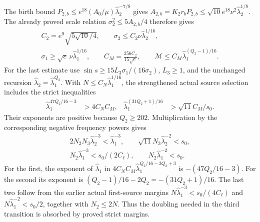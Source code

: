 The birth bound $P_{2,b}\leq e^{18}(A_0/\mu)
\widehat\lambda_2^{-7/8}$ gives
$A_{2,b}=K_2r_bP_{2,b}\leq\sqrt{10}e^{18}\nu^2
\widehat\lambda_2^{1/8}$. The already proved scale relation
$\sigma_2^2\leq5A_{2,b}/4$ therefore gives
\begin{equation}\label{tts:sourceconstants}
 \begin{gathered}
 C_2=e^9\sqrt{5\sqrt{10}/4},\qquad
 \sigma_2\leq C_2\nu\widehat\lambda_2^{1/16},\\
 \sigma_1\geq\sqrt e\,\nu\widehat\lambda_1^{1/16},\qquad
 C_M=\frac{256C_2}{15\sqrt e},\qquad
 \mathcal M\leq C_M\widehat\lambda_1^{(Q_2-1)/16}.
 \end{gathered}
\end{equation}
For the last estimate use
$\sin s\geq15L_3\sigma_1/(16\sigma_2)$, $L_3\geq1$,
and the unchanged recursion
$\widehat\lambda_2=\widehat\lambda_1^{Q_2}$.
With $N\leq C_N\widehat\lambda_1^{1/16}$, the strengthened
actual source selection includes the strict inequalities
\begin{align}\label{tts:sourceexponents}
 \widehat\lambda_1^{47Q_2/16-3}&>4C_NC_M,
 &\widehat\lambda_1^{(31Q_2+1)/16}&>\sqrt{11}C_M/s_0.
\end{align}
Their exponents are positive because $Q_2\geq202$.
Multiplication by the corresponding negative frequency powers gives
\begin{equation}\label{tts:nestingnumbers}
 \begin{gathered}
 2N_2N_3\widehat\lambda_2^{-3}
       <\widehat\lambda_1^{-3},\qquad
 \sqrt{11}N_3\widehat\lambda_2^{-2}<s_0,\\
 N_2\widehat\lambda_1^{-3}<s_0/(2C_\ell),\qquad
 N_2\widehat\lambda_1^{-2}<s_0.
 \end{gathered}
\end{equation}
For the first, the exponent of $\widehat\lambda_1$ in
$4C_NC_M\widehat\lambda_1^{Q_2/16-3Q_2+3}$ is
$-(47Q_2/16-3)$. For the second its exponent is
$(Q_2-1)/16-2Q_2=-(31Q_2+1)/16$.
The last two follow from the earlier actual first-source margins
$N\widehat\lambda_1^{-3}<s_0/(4C_\ell)$ and
$N\widehat\lambda_1^{-2}<s_0/2$, together with $N_2\leq2N$.
Thus the doubling needed in the third transition is absorbed by
proved strict margins.

